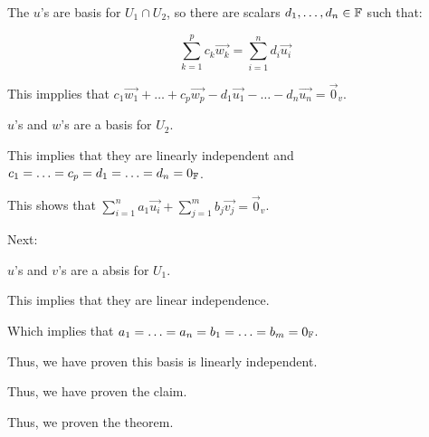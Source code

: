{{{		The \(u\)'s are basis for \(U_1 \cap U_2\), so there are scalars \(d_1, \ldots, d_{n} \in \FF\) such that:

		\[
			\sum_{k=1}^{p} c_k \vec{w_k} = \sum_{i=1}^{n} d_i \vec{u_i}
		\]

		This impplies that \(c_1 \vec{w_1} + \ldots + c_{p} \vec{w_p} - d_1 \vec{u_1} - \ldots - d_{n} \vec{u_n} = \vec{0}_{v} \).

		\(u\)'s and \(w\)'s are a basis for \(U_2\).

		This implies that they are linearly independent and \(c_1 = \ldots = c_{p} = d_1 = \ldots = d_{n} = 0_{\FF}\).

				This shows that \(\sum_{i=1}^{n} a_1 \vec{u_{i}} + \sum_{j=1}^{m} b_j \vec{v_j} = \vec{0}_{v} \).

				Next:

				\(u\)'s and \(v\)'s are a absis for \(U_1\).

				This implies that they are linear independence.

				Which implies that \(a_1 = \ldots = a_{n} = b_1 = \ldots = b_{m} = 0_{\FF}\).

						Thus, we have proven this basis is linearly independent.

					}

				Thus,  we have proven the claim.

				Thus, we proven the theorem.
			}
	}
